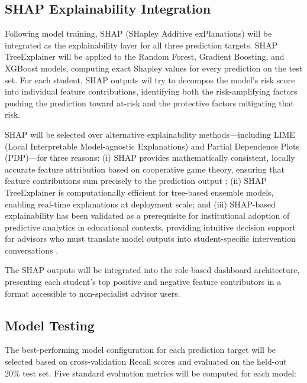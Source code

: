 \documentclass[12pt]{report}
\begin{document}
\subsection{SHAP Explainability Integration}

Following model training, SHAP (SHapley Additive exPlanations)
\parencite{lundberg2017unified} will be integrated as the explainability layer for all
three prediction targets. SHAP TreeExplainer will be applied to the Random Forest,
Gradient Boosting, and XGBoost models, computing exact Shapley values for
every prediction on the test set. For each student, SHAP outputs wil try to decompos
the model's risk score into individual feature contributions, identifying both
the risk-amplifying factors pushing the prediction toward at-risk and the
protective factors mitigating that risk.

SHAP will be selected over alternative explainability methods---including LIME
(Local Interpretable Model-agnostic Explanations) and Partial Dependence
Plots (PDP)---for three reasons: (i) SHAP provides mathematically consistent,
locally accurate feature attribution based on cooperative game theory, ensuring
that feature contributions sum precisely to the prediction output
\parencite{lundberg2017unified}; (ii) SHAP TreeExplainer is computationally
efficient for tree-based ensemble models, enabling real-time explanations at
deployment scale; and (iii) SHAP-based explainability has been validated as a
prerequisite for institutional adoption of predictive analytics in educational
contexts, providing intuitive decision support for advisors who must translate
model outputs into student-specific intervention conversations
\parencite{zhang2021, kwakye2025}.

The SHAP outputs will be integrated into the role-based dashboard architecture, presenting each student's top
positive and negative feature contributors in a format accessible to
non-specialist advisor users.

\subsection{Model Testing}

The best-performing model configuration for each prediction target will be selected
based on cross-validation Recall scores and evaluated on the held-out 20\% test
set. Five standard evaluation metrics will be computed for each model:
\end{document}
